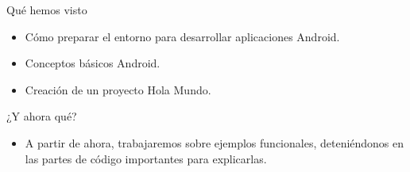 \begin{frame}{Qué hemos visto}
  \begin{itemize}
  \item
    Cómo preparar el entorno para desarrollar aplicaciones Android.
  \item
    Conceptos básicos Android.
  \item
    Creación de un proyecto Hola Mundo.
  \end{itemize}
\end{frame}

\begin{frame}{¿Y ahora qué?}
  \begin{itemize}
  \item
    A partir de ahora, trabajaremos sobre ejemplos funcionales, deteniéndonos en las partes de código importantes para explicarlas.
  \end{itemize}
\end{frame}
